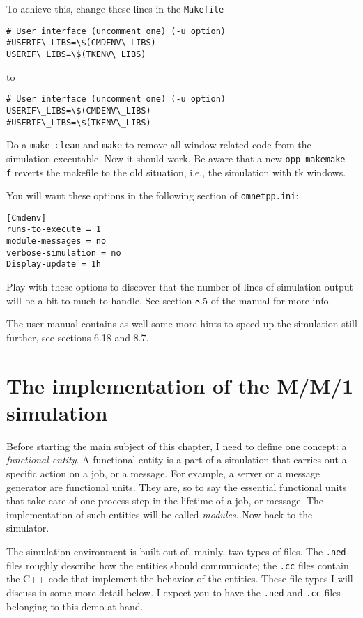 \documentclass[a4paper]{article}
\begin{document}
To achieve this, change these lines in the  \texttt{Makefile}

\begin{verbatim}
# User interface (uncomment one) (-u option)
#USERIF\_LIBS=\$(CMDENV\_LIBS)
USERIF\_LIBS=\$(TKENV\_LIBS)
\end{verbatim}

to

\begin{verbatim}
# User interface (uncomment one) (-u option)
USERIF\_LIBS=\$(CMDENV\_LIBS)
#USERIF\_LIBS=\$(TKENV\_LIBS)
\end{verbatim}

Do a \texttt{make clean} and \texttt{make} to remove all window
related code from the simulation executable. Now it should work. Be
aware that a new \texttt{opp_makemake -f} reverts the makefile to the old
situation, i.e., the simulation with tk windows.

You will want these options in the following section of
\texttt{omnetpp.ini}:
\begin{verbatim}
[Cmdenv]
runs-to-execute = 1
module-messages = no
verbose-simulation = no
Display-update = 1h
\end{verbatim}
Play with these options to discover that the number of lines of
simulation output will be a bit to much to handle. See section 8.5 of
the manual for more info.

The user manual contains as well some more hints to speed up the
simulation still further, see sections 6.18 and  8.7.

\section{The implementation of the M/M/1 simulation}
\label{sec:impl-fifo-simul}
Before starting the main subject of this chapter, I need to define one
concept: a \emph{functional entity}. A functional entity is a part of
a simulation that carries out a specific action on a job, or a
message. For example, a server or a message generator are functional
units. They are, so to say the essential functional units that take
care of one process step in the lifetime of a job, or message. The
implementation of such entities will be called \emph{modules}. Now
back to the simulator.

The simulation environment is built out of, mainly, two types of
files.  The \texttt{.ned} files roughly describe how the entities
should communicate; the \texttt{.cc} files contain the C++ code that
implement the behavior of the entities. These file types I will
discuss in some more detail below. I expect you to have the
\texttt{.ned} and \texttt{.cc} files belonging to this demo at hand.
\end{document}

